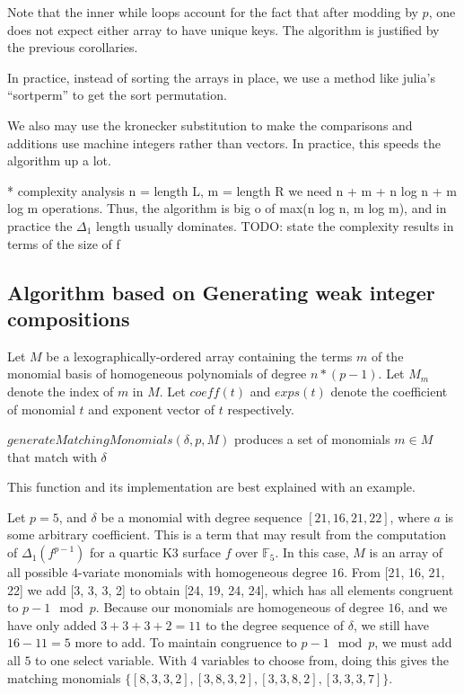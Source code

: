 Note that the inner while loops account for the fact that
after modding by \(p\), one does not expect 
either array to have unique keys.
The algorithm is justified by the previous corollaries.

In practice, instead of sorting the arrays in place, 
we use a method like julia's ``sortperm''
to get the sort permutation.

We also may use the kronecker substitution to make
the comparisons and additions use machine integers
rather than vectors.
In practice, this speeds the algorithm up a lot.

* complexity analysis
n = length L, m = length R
we need n + m + n log n + m log m operations.
Thus, the algorithm is big o of max(n log n, m log m),
and in practice the \(\Delta_{1}\) length
usually dominates.
TODO: state the complexity results in terms of the size of f


\subsection{Algorithm based on Generating weak integer compositions}

	Let \(M\) be a lexographically-ordered array containing the terms $m$ of the monomial basis of
	homogeneous polynomials of degree
	\(n*(p-1)\). Let $M_m$ denote the index of $m$ in $M$. Let $coeff(t)$ and $exps(t)$ denote the coefficient of monomial $t$ and exponent vector of $t$ respectively.

\begin{defn}
    $generateMatchingMonomials(\delta, p, M)$ produces a set of monomials $m \in M$ that match with $\delta$
\end{defn}

This function and its implementation are best explained with an example.

\begin{ex}
    Let $p = 5$, and $\delta$ be a monomial with degree sequence $[21, 16, 21, 22]$, where $a$ is some arbitrary coefficient. This is a term that may
    result from the computation of $\Delta_1(f^{p - 1})$ for a quartic K3 surface $f$ over $\mathbb{F}_5$. In this case, $M$ is an array
    of all possible $4$-variate monomials with homogeneous degree $16$. From [21, 16, 21, 22] we add [3, 3, 3, 2] to obtain [24, 19, 24, 24], which
    has all elements congruent to $p-1 \mod p$. Because our monomials are homogeneous of degree $16$, and
    we have only added $3 + 3 + 3 + 2 = 11$ to the degree sequence of $\delta$, we still have $16 - 11 = 5$ more to add.
    To maintain congruence to $p-1 \mod p$, we must add all $5$ to one select variable. With 4 variables to choose from, doing this gives the
    matching monomials $\{[8, 3, 3, 2], [3, 8, 3, 2], [3, 3, 8, 2], [3, 3, 3, 7]\}$.
\end{ex}

